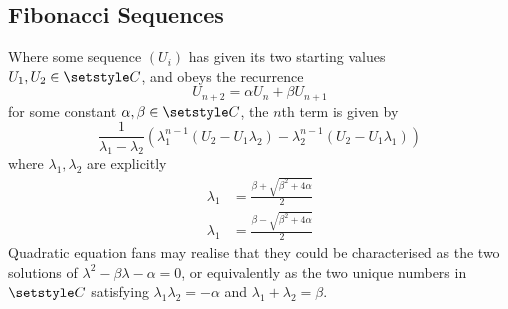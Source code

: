 \subsection{Fibonacci Sequences}

\begin{theorem}
 Where some sequence \((U_i)\) has given its two starting values
 \(U_1, U_2 \in \Complex\), and obeys the recurrence
 \begin{equation*}
  U_{n + 2} = \alpha U_n + \beta U_{n + 1}
 \end{equation*}
 for some constant \(\alpha, \beta \in \Complex\), the \(n\)th term is given by
 \begin{equation*}
  \frac 1{\lambda_1 - \lambda_2}(\lambda_1^{n - 1} (U_2 - U_1 \lambda_2)
                               - \lambda_2^{n - 1} (U_2 - U_1 \lambda_1))
 \end{equation*}
 where \(\lambda_1, \lambda_2\) are explicitly
 \begin{align*}
  \lambda_1 &= \frac {\beta + \sqrt{\beta^2 + 4\alpha}}2 \\
  \lambda_1 &= \frac {\beta - \sqrt{\beta^2 + 4\alpha}}2
 \end{align*}
 Quadratic equation fans may realise that they could be characterised as the two
 solutions of \(\lambda^2 - \beta \lambda - \alpha = 0\), or equivalently as the
 two unique numbers in \(\Complex\) satisfying \(\lambda_1 \lambda_2 = -\alpha\)
 and \(\lambda_1 + \lambda_2 = \beta\).
\end{theorem}

